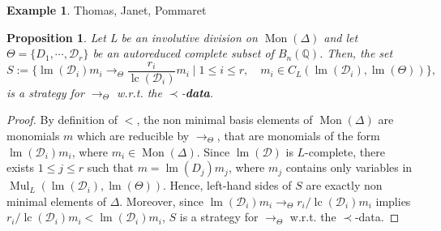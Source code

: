 \documentclass[10pt]{easychair}
\newtheorem{proposition}[theorem]{Proposition}
\theoremstyle{definition}
\newtheorem{example}[theorem]{Example}
\newcommand\data{{\color{red}\bf data}}
\newcommand\D{\mathcal{D}}
\DeclareMathOperator{\lm}{lm}
\DeclareMathOperator{\lc}{lc}
\newcommand\Q{\mathbb{Q}}
\newcommand\Weyl[1]{B_{#1}(\Q)}
\DeclareMathOperator{\Mon}{Mon}
\DeclareMathOperator{\Mul}{Mul}
\newcommand\rewTheta{\to_{\Theta}}
\begin{document}
\begin{example}
  Thomas, Janet, Pommaret
\end{example}

\begin{proposition}
  Let L be an involutive division on $\Mon(\Delta)$ and let
  $\Theta=\{D_1,\cdots,\D_r\}$ be an autoreduced complete subset of
  $\Weyl{n}$. Then, the set 
  \[S:=\{\lm(\D_i)m_i\rewTheta\frac{r_i}{\lc(\D_i)}m_i\mid1\leq i\leq r,
  \quad m_i\in C_L(\lm(\D_i),\lm(\Theta))\},\]
  is a strategy for $\rewTheta$ w.r.t. the $\prec$-\data.
\end{proposition}

\begin{proof}
  By definition of $<$, the non minimal basis elements of $\Mon(\Delta)$
  are monomials $m$ which are reducible by $\rewTheta$, that are
  monomials of the form $\lm(\D_i)m_i$, where $m_i\in\Mon(\Delta)$. Since
  $\lm(\D)$ is $L$-complete, there exists $1\leq j\leq r$ such that
  $m=\lm(D_j)m_j$, where $m_j$ contains only variables in
  $\Mul_L(\lm(\D_i),\lm(\Theta))$. Hence, left-hand sides of $S$ are
  exactly non minimal elements of $\Delta$. Moreover, since
  $\lm(\D_i)m_i\rewTheta r_i/\lc(\D_i)m_i$ implies
  $r_i/\lc(\D_i)m_i<\lm(\D_i)m_i$, $S$ is a strategy for $\rewTheta$
  w.r.t. the $\prec$-data.
\end{proof}
\end{document}
